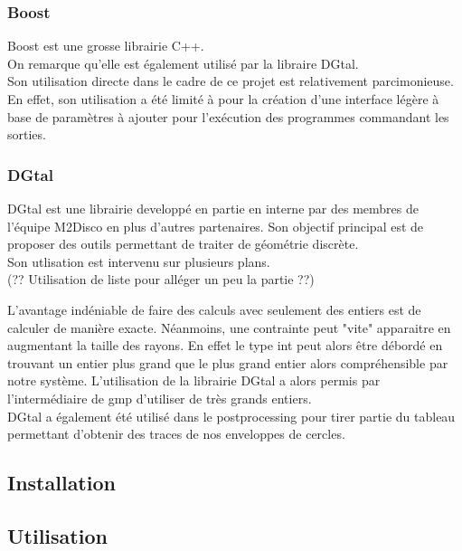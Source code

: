 \subsubsection{Boost}

Boost \cite{boost} est une grosse librairie C++. \\
On remarque qu'elle est également utilisé par la libraire DGtal.\\

Son utilisation directe dans le cadre de ce projet est relativement parcimonieuse. En effet, son utilisation a été limité à  pour la création d'une interface légère à base de paramètres à ajouter pour l’exécution des programmes commandant les sorties.


\subsubsection{DGtal}

DGtal \cite{DGtal} est une librairie developpé en partie en interne par des membres de l'équipe M2Disco en plus d'autres partenaires. Son objectif principal est de proposer des outils permettant de traiter de géométrie discrète. \\

Son utlisation est intervenu sur plusieurs plans. \\

(?? Utilisation de liste pour alléger un peu la partie ??)

L'avantage indéniable de faire des calculs avec seulement des entiers est de calculer de manière exacte. Néanmoins, une contrainte peut "vite" apparaitre en augmentant la taille des rayons. En effet le type int peut alors être débordé en trouvant un entier plus grand que le plus grand entier alors compréhensible par notre système. L'utilisation de la librairie DGtal a alors permis par l'intermédiaire de gmp d’utiliser de très grands entiers.\\

DGtal a également été utilisé dans le postprocessing pour tirer partie du tableau permettant d'obtenir des traces de nos enveloppes de cercles.

\subsection{Installation}
\label{pt2-ch2-sec:2:2}

\subsection{Utilisation}
\label{pt2-ch2-sec:2:3}




